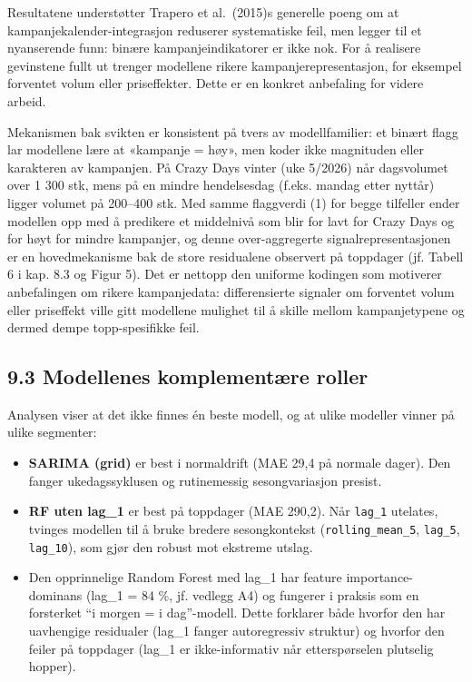\documentclass[
  norsk,
  11pt,
  a4paper,
]{article}
\providecommand{\tightlist}{%
  \setlength{\itemsep}{0pt}\setlength{\parskip}{0pt}}
\begin{document}
Resultatene understøtter Trapero et al.~(2015)s generelle poeng om at
kampanjekalender-integrasjon reduserer systematiske feil, men legger til
et nyanserende funn: binære kampanjeindikatorer er ikke nok. For å
realisere gevinstene fullt ut trenger modellene rikere
kampanjerepresentasjon, for eksempel forventet volum eller priseffekter.
Dette er en konkret anbefaling for videre arbeid.

Mekanismen bak svikten er konsistent på tvers av modellfamilier: et
binært flagg lar modellene lære at «kampanje = høy», men koder ikke
magnituden eller karakteren av kampanjen. På Crazy Days vinter (uke
5/2026) når dagsvolumet over 1 300 stk, mens på en mindre hendelsesdag
(f.eks. mandag etter nyttår) ligger volumet på 200--400 stk. Med samme
flaggverdi (1) for begge tilfeller ender modellen opp med å predikere et
middelnivå som blir for lavt for Crazy Days og for høyt for mindre
kampanjer, og denne over-aggregerte signalrepresentasjonen er en
hovedmekanisme bak de store residualene observert på toppdager (jf.
Tabell 6 i kap. 8.3 og Figur 5). Det er nettopp den uniforme kodingen
som motiverer anbefalingen om rikere kampanjedata: differensierte
signaler om forventet volum eller priseffekt ville gitt modellene
mulighet til å skille mellom kampanjetypene og dermed dempe
topp-spesifikke feil.

\subsection{9.3 Modellenes komplementære
roller}\label{modellenes-komplementuxe6re-roller}

Analysen viser at det ikke finnes én beste modell, og at ulike modeller
vinner på ulike segmenter:

\begin{itemize}
\tightlist
\item
  \textbf{SARIMA (grid)} er best i normaldrift (MAE 29,4 på normale
  dager). Den fanger ukedagssyklusen og rutinemessig sesongvariasjon
  presist.
\item
  \textbf{RF uten lag\_1} er best på toppdager (MAE 290,2). Når
  \texttt{lag\_1} utelates, tvinges modellen til å bruke bredere
  sesongkontekst (\texttt{rolling\_mean\_5}, \texttt{lag\_5},
  \texttt{lag\_10}), som gjør den robust mot ekstreme utslag.
\item
  Den opprinnelige Random Forest med lag\_1 har feature
  importance-dominans (lag\_1 = 84 \%, jf. vedlegg A4) og fungerer i
  praksis som en forsterket ``i morgen = i dag''-modell. Dette forklarer
  både hvorfor den har uavhengige residualer (lag\_1 fanger
  autoregressiv struktur) og hvorfor den feiler på toppdager (lag\_1 er
  ikke-informativ når etterspørselen plutselig hopper).
\end{itemize}
\end{document}
